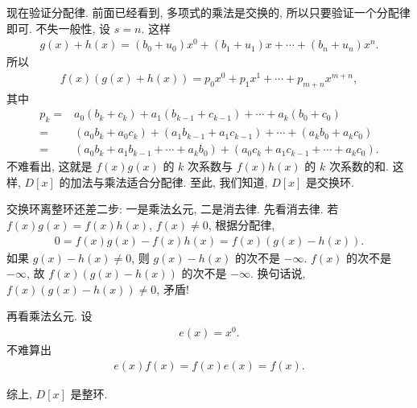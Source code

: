\begin{pf}
    现在验证分配律. 前面已经看到, 多项式的乘法是交换的, 所以只要验证一个分配律即可. 不失一般性, 设 $s=n$. 这样
    \begin{align*}
        g(x) + h(x) = (b_0 + u_0) x^0 + (b_1 + u_1) x + \cdots + (b_n + u_n) x^n.
    \end{align*}
    所以
    \begin{align*}
        f(x) (g(x) + h(x)) = p_0 x^0 + p_1 x^1 + \cdots + p_{m+n} x^{m+n},
    \end{align*}
    其中
    \begin{align*}
        p_k
        = {} & a_0 (b_k + c_k) + a_1 (b_{k-1} + c_{k-1}) + \cdots + a_k (b_0 + c_0)                     \\
        = {} & (a_0 b_k + a_0 c_k) + (a_1 b_{k-1} + a_1 c_{k-1}) + \cdots + (a_k b_0 + a_k c_0)         \\
        = {} & (a_0 b_k + a_1 b_{k-1} + \cdots + a_k b_0) + (a_0 c_k + a_1 c_{k-1} + \cdots + a_k c_0).
    \end{align*}
    不难看出, 这就是 $f(x)g(x)$ 的 $k$ 次系数与 $f(x)h(x)$ 的 $k$ 次系数的和. 这样, $D[x]$ 的加法与乘法适合分配律. 至此, 我们知道, $D[x]$ 是交换环.

    交换环离整环还差二步: 一是乘法幺元, 二是消去律. 先看消去律. 若 $f(x)g(x) = f(x)h(x)$, $f(x) \neq 0$, 根据分配律,
    \begin{align*}
        0 = f(x)g(x) - f(x)h(x) = f(x) (g(x) - h(x)).
    \end{align*}
    如果 $g(x) - h(x) \neq 0$, 则 $g(x) - h(x)$ 的次不是 $-\infty$. $f(x)$ 的次不是 $-\infty$, 故 $f(x)(g(x) - h(x))$ 的次不是 $-\infty$. 换句话说, $f(x)(g(x) - h(x)) \neq 0$, 矛盾!

    再看乘法幺元. 设
    \begin{align*}
        e(x) = x^0.
    \end{align*}
    不难算出
    \begin{align*}
        e(x) f(x) = f(x) e(x) = f(x).
    \end{align*}

    综上, $D[x]$ 是整环.
\end{pf}

